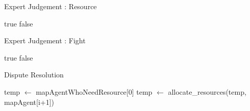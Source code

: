 

\begin{algorithm}
\begin{algorithmic}
\scriptsize
\caption{Expert Judgement : Resource}\label{alg:21}
\State
\Return true
\Else
\State
\Return false
\EndIf
\end{algorithmic}
\end{algorithm}



\begin{algorithm}
\begin{algorithmic}
\scriptsize    
\caption{Expert Judgement : Fight}\label{alg:22}
\State
\Return true
\Else
\State
\Return false
\EndIf
\end{algorithmic}
\end{algorithm}



\begin{algorithm}
\begin{algorithmic}
\scriptsize
\caption{Dispute Resolution}\label{alg:23}
\State temp $\leftarrow$ mapAgentWhoNeedResource[0]
\State temp $\leftarrow$ allocate\_resources(temp, mapAgent[i+1])
\EndWhile
\end{algorithmic}
\end{algorithm}

